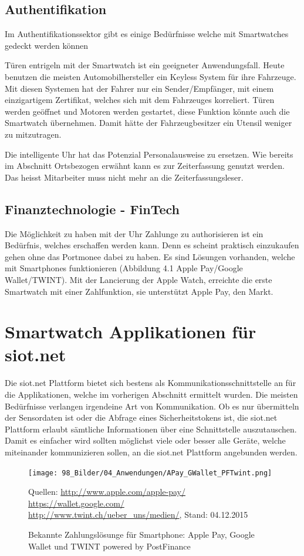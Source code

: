 \subsection{Authentifikation}
Im Authentifikationssektor gibt es einige Bedürfnisse welche mit Smartwatches gedeckt werden können

Türen entrigeln mit der Smartwatch ist ein geeigneter Anwendungsfall. Heute benutzen die meisten Automobilhersteller ein Keyless System für ihre Fahrzeuge. Mit diesen Systemen hat der Fahrer nur ein Sender/Empfänger, mit einem einzigartigem Zertifikat, welches sich mit dem Fahrzeuges korreliert. Türen werden geöffnet und Motoren werden gestartet, diese Funktion könnte auch die Smartwatch übernehmen. Damit hätte der Fahrzeugbesitzer ein Utensil weniger zu mitzutragen.

Die intelligente Uhr hat das Potenzial Personalausweise zu ersetzen. Wie bereits im Abschnitt Ortsbezogen erwähnt kann es zur Zeiterfassung genutzt werden. Das heisst Mitarbeiter muss nicht mehr an die Zeiterfassungsleser.

\subsection{Finanztechnologie - FinTech}
Die Möglichkeit zu haben mit der Uhr Zahlunge zu authorisieren ist ein Bedürfnis, welches erschaffen werden kann. Denn es scheint praktisch einzukaufen gehen ohne das Portmonee dabei zu haben. Es sind Lösungen vorhanden, welche mit Smartphones funktionieren {(Abbildung 4.1 Apple Pay/Google Wallet/TWINT)}. Mit der Lancierung der Apple Watch, erreichte die erste Smartwatch mit einer Zahlfunktion, sie unterstützt Apple Pay, den Markt.

\section{Smartwatch Applikationen für siot.net}
Die siot.net Plattform bietet sich bestens als Kommunikationsschnittstelle an für die Applikationen, welche im vorherigen Abschnitt ermittelt wurden. Die meisten Bedürfnisse verlangen irgendeine Art von Kommunikation. Ob es nur übermitteln der Sensordaten ist oder die Abfrage eines Sicherheitstokens ist, die siot.net Plattform erlaubt sämtliche Informationen über eine Schnittstelle auszutauschen. Damit es einfacher wird sollten möglichst viele oder besser alle Geräte, welche miteinander kommunizieren sollen, an die siot.net Plattform angebunden werden.
\begin{figure}[h]
  \centering
  \texttt{[image: 98\_Bilder/04\_Anwendungen/APay\_GWallet\_PFTwint.png]}
  \caption[Mobile Zahlungslösungen: Apple Pay, Google Wallet und TWINT powered by PostFinance]{Bekannte Zahlungslösunge für Smartphone: Apple Pay, Google Wallet und TWINT powered by PostFinance}
  \footnotesize Quellen: \url{http://www.apple.com/apple-pay/} \url{https://wallet.google.com/} \url{http://www.twint.ch/ueber_uns/medien/}, Stand: 04.12.2015
\end{figure}

